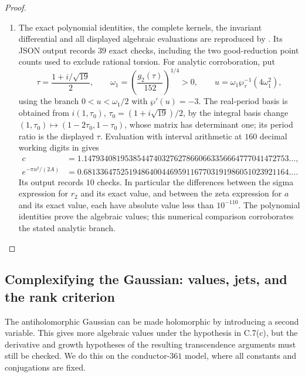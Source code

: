 \begin{proof}
\begin{enumerate}[label=\arabic*.,leftmargin=*]
\item The exact polynomial identities, the complete kernels, the
invariant differential and all displayed algebraic evaluations are
reproduced by
.
Its JSON output records $39$ exact checks, including the two good-reduction
point counts used to exclude rational torsion. For analytic corroboration,
put
\[
 \tau=\frac{1+i/\sqrt{19}}2,\qquad
 \omega_1=\left(\frac{g_2(\tau)}{152}\right)^{1/4}>0,
 \qquad u=\omega_1\wp_\tau^{-1}(4\omega_1^2),
\]
using the branch $0<u<\omega_1/2$ with $\wp'(u)=-3$.
The real-period basis is obtained from
$i(1,\tau_0)$, $\tau_0=(1+i\sqrt{19})/2$, by the integral
basis change $(1,\tau_0)\mapsto(1-2\tau_0,1-\tau_0)$, whose
matrix has determinant one; its period ratio is the displayed $\tau$.
Evaluation with interval arithmetic at $160$ decimal working digits in
gives
\[
 \begin{aligned}
 c&=1.14793408195385447403276278660663356664777041472753\ldots,\\
 e^{-\pi u^2/(2A)}
  &=0.68133647525194864004469591167703191986051023921164\ldots.
 \end{aligned}
\]
Its output records $10$ checks. In particular the differences between the
sigma expression for $r_2$ and its exact value, and between the zeta
expression for $a$ and its exact value, each have absolute value less than
$10^{-110}$. The polynomial identities prove the algebraic values; this
numerical comparison corroborates the stated analytic branch.
\end{enumerate}
\end{proof}

\subsection{Complexifying the Gaussian: values, jets, and the rank criterion}

The antiholomorphic Gaussian can be made holomorphic by introducing a
second variable. This gives more algebraic values under the hypothesis
in C.7(c), but the derivative and growth hypotheses of the resulting
transcendence arguments must still be checked. We do this on the
conductor-$361$ model, where all constants and conjugations are fixed.

